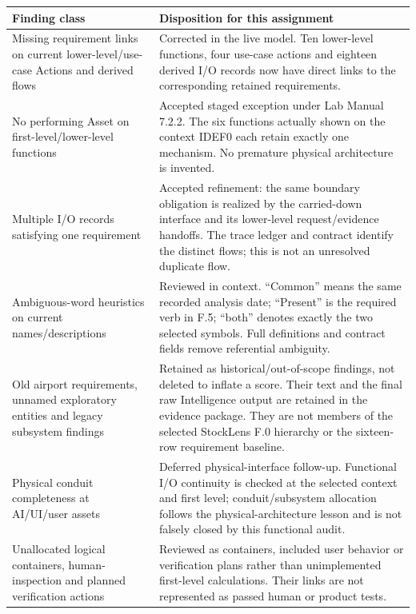 \documentclass[11pt,letterpaper]{article}
\begin{document}
\begin{longtable}{@{}>{\raggedright\arraybackslash}p{.28\linewidth}>{\raggedright\arraybackslash}p{.66\linewidth}@{}}\toprule
Finding class & Disposition for this assignment\\\midrule\endhead
Missing requirement links on current lower-level/use-case Actions and derived flows & Corrected in the live model. Ten lower-level functions, four use-case actions and eighteen derived I/O records now have direct links to the corresponding retained requirements.\\[4pt]
No performing Asset on first-level/lower-level functions & Accepted staged exception under Lab Manual 7.2.2. The six functions actually shown on the context IDEF0 each retain exactly one mechanism. No premature physical architecture is invented.\\[4pt]
Multiple I/O records satisfying one requirement & Accepted refinement: the same boundary obligation is realized by the carried-down interface and its lower-level request/evidence handoffs. The trace ledger and contract identify the distinct flows; this is not an unresolved duplicate flow.\\[4pt]
Ambiguous-word heuristics on current names/descriptions & Reviewed in context. ``Common'' means the same recorded analysis date; ``Present'' is the required verb in F.5; ``both'' denotes exactly the two selected symbols. Full definitions and contract fields remove referential ambiguity.\\[4pt]
Old airport requirements, unnamed exploratory entities and legacy subsystem findings & Retained as historical/out-of-scope findings, not deleted to inflate a score. Their text and the final raw Intelligence output are retained in the evidence package. They are not members of the selected StockLens F.0 hierarchy or the sixteen-row requirement baseline.\\[4pt]
Physical conduit completeness at AI/UI/user assets & Deferred physical-interface follow-up. Functional I/O continuity is checked at the selected context and first level; conduit/subsystem allocation follows the physical-architecture lesson and is not falsely closed by this functional audit.\\[4pt]
Unallocated logical containers, human-inspection and planned verification actions & Reviewed as containers, included user behavior or verification plans rather than unimplemented first-level calculations. Their links are not represented as passed human or product tests.\\\bottomrule\end{longtable}
\end{document}
